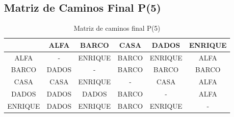 \documentclass[12pt]{article}
\begin{document}
\clearpage
\subsection{Matriz de Caminos Final P(5)}
\begin{table}[h!]
\centering
\begin{tabular}{|c|c|c|c|c|c|}
\hline
 & ALFA & BARCO & CASA & DADOS & ENRIQUE \\\hline
ALFA & - & ENRIQUE & BARCO & ENRIQUE & ALFA \\\hline
BARCO & DADOS & - & BARCO & BARCO & BARCO \\\hline
CASA & CASA & ENRIQUE & - & CASA & ALFA \\\hline
DADOS & DADOS & DADOS & BARCO & - & ALFA \\\hline
ENRIQUE & DADOS & ENRIQUE & BARCO & ENRIQUE & - \\\hline
\end{tabular}
\caption{Matriz de caminos final P(5)}
\end{table}

\clearpage
\end{document}
